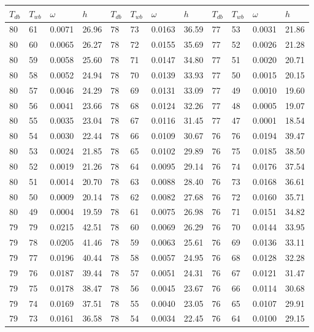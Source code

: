 \begin{tabular}{llll|llll|llll}
 \toprule 
\(T_{db}\) & \(T_{wb}\) & \(\omega\) & \(h\) & \(T_{db}\) & \(T_{wb}\) & \(\omega\) & \(h\) & \(T_{db}\) & \(T_{wb}\) & \(\omega\) & \(h\)  \\ \midrule 
80 & 61 & 0.0071 & 26.96 & 78 & 73 & 0.0163 & 36.59 & 77 & 53 & 0.0031 & 21.86\\
80 & 60 & 0.0065 & 26.27 & 78 & 72 & 0.0155 & 35.69 & 77 & 52 & 0.0026 & 21.28\\
80 & 59 & 0.0058 & 25.60 & 78 & 71 & 0.0147 & 34.80 & 77 & 51 & 0.0020 & 20.71\\
80 & 58 & 0.0052 & 24.94 & 78 & 70 & 0.0139 & 33.93 & 77 & 50 & 0.0015 & 20.15\\
80 & 57 & 0.0046 & 24.29 & 78 & 69 & 0.0131 & 33.09 & 77 & 49 & 0.0010 & 19.60\\
80 & 56 & 0.0041 & 23.66 & 78 & 68 & 0.0124 & 32.26 & 77 & 48 & 0.0005 & 19.07\\
80 & 55 & 0.0035 & 23.04 & 78 & 67 & 0.0116 & 31.45 & 77 & 47 & 0.0001 & 18.54\\
80 & 54 & 0.0030 & 22.44 & 78 & 66 & 0.0109 & 30.67 & 76 & 76 & 0.0194 & 39.47\\
80 & 53 & 0.0024 & 21.85 & 78 & 65 & 0.0102 & 29.89 & 76 & 75 & 0.0185 & 38.50\\
80 & 52 & 0.0019 & 21.26 & 78 & 64 & 0.0095 & 29.14 & 76 & 74 & 0.0176 & 37.54\\
80 & 51 & 0.0014 & 20.70 & 78 & 63 & 0.0088 & 28.40 & 76 & 73 & 0.0168 & 36.61\\
80 & 50 & 0.0009 & 20.14 & 78 & 62 & 0.0082 & 27.68 & 76 & 72 & 0.0160 & 35.71\\
80 & 49 & 0.0004 & 19.59 & 78 & 61 & 0.0075 & 26.98 & 76 & 71 & 0.0151 & 34.82\\
79 & 79 & 0.0215 & 42.51 & 78 & 60 & 0.0069 & 26.29 & 76 & 70 & 0.0144 & 33.95\\
79 & 78 & 0.0205 & 41.46 & 78 & 59 & 0.0063 & 25.61 & 76 & 69 & 0.0136 & 33.11\\
79 & 77 & 0.0196 & 40.44 & 78 & 58 & 0.0057 & 24.95 & 76 & 68 & 0.0128 & 32.28\\
79 & 76 & 0.0187 & 39.44 & 78 & 57 & 0.0051 & 24.31 & 76 & 67 & 0.0121 & 31.47\\
79 & 75 & 0.0178 & 38.47 & 78 & 56 & 0.0045 & 23.67 & 76 & 66 & 0.0114 & 30.68\\
79 & 74 & 0.0169 & 37.51 & 78 & 55 & 0.0040 & 23.05 & 76 & 65 & 0.0107 & 29.91\\
79 & 73 & 0.0161 & 36.58 & 78 & 54 & 0.0034 & 22.45 & 76 & 64 & 0.0100 & 29.15\\

\end{tabular}
